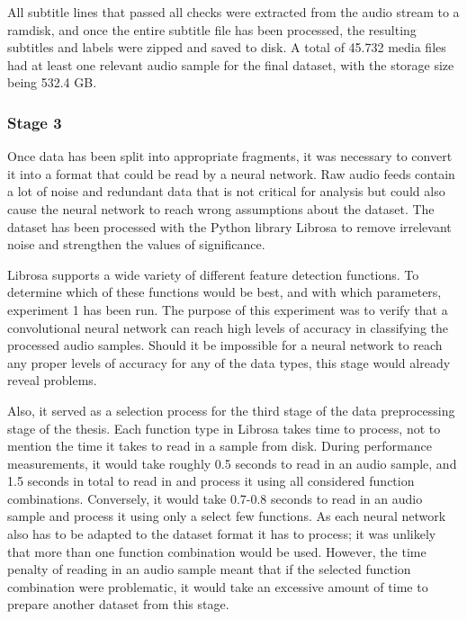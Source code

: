 All subtitle lines that passed all checks were extracted from the audio stream to a ramdisk, and once the entire subtitle file has been processed, the resulting subtitles and labels were zipped and saved to disk.
A total of 45.732 media files had at least one relevant audio sample for the final dataset, with the storage size being 532.4 GB.


\subsubsection{Stage 3}
Once data has been split into appropriate fragments, it was necessary to convert it into a format that could be read by a neural network.
Raw audio feeds contain a lot of noise and redundant data that is not critical for analysis but could also cause the neural network to reach wrong assumptions about the dataset.
The dataset has been processed with the Python library Librosa to remove irrelevant noise and strengthen the values of significance.

Librosa supports a wide variety of different feature detection functions.
To determine which of these functions would be best, and with which parameters, experiment 1 has been run.
The purpose of this experiment was to verify that a convolutional neural network can reach high levels of accuracy in classifying the processed audio samples.
Should it be impossible for a neural network to reach any proper levels of accuracy for any of the data types, this stage would already reveal problems.

Also, it served as a selection process for the third stage of the data preprocessing stage of the thesis.
Each function type in Librosa takes time to process, not to mention the time it takes to read in a sample from disk.
During performance measurements, it would take roughly 0.5 seconds to read in an audio sample, and 1.5 seconds in total to read in and process it using all considered function combinations.
Conversely, it would take 0.7-0.8 seconds to read in an audio sample and process it using only a select few functions.
As each neural network also has to be adapted to the dataset format it has to process; it was unlikely that more than one function combination would be used.
However, the time penalty of reading in an audio sample meant that if the selected function combination were problematic, it would take an excessive amount of time to prepare another dataset from this stage.

